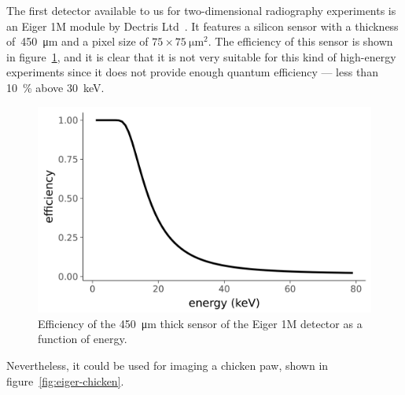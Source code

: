 The first detector available to us for two-dimensional radiography experiments is
an Eiger 1M module by Dectris Ltd~\parencite{dectris-eiger, 1748-0221-9-05-C05032}. It features a silicon sensor
with a thickness of~\SI{450}{\micro\meter} and a pixel size of
$75\times\SI{75}{\micro\meter\squared}$. The efficiency of this sensor is
shown in figure~\ref{fig:eiger-efficiency}, and it is clear that it is not
very suitable for this kind of high-energy experiments since it does not
provide enough quantum efficiency --- less than \SI{10}{\percent} above
\SI{30}{\kilo\eV}.

\begin{figure}[htb]
    \centering
    \includegraphics[width=\textwidth]{gfx/eiger/efficiency.png}
    \caption[Efficiency of the Eiger silicon detector]{Efficiency of the \SI{450}{\micro\meter} thick sensor of the
Eiger 1M detector as a function of energy.}
    \label{fig:eiger-efficiency}
\end{figure}

Nevertheless, it could be used for imaging a chicken paw, shown in
figure~\ref{fig:eiger-chicken}.

